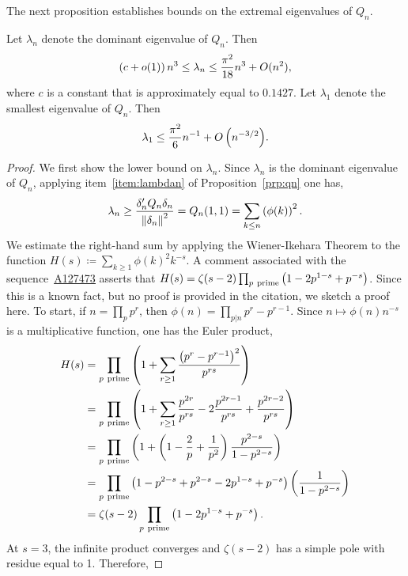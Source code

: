 \documentclass[12pt,reqno]{article}
\newcommand{\seqnum}[1]{\href{https://oeis.org/#1}{\rm \underline{#1}}}
\newcommand{\paren}[1]{\left\lparen{#1}\right\rparen}
\newcommand{\norm}[1]{\ensuremath{\left\|{#1}\right\|}}
\begin{document}
The next proposition establishes bounds on the extremal eigenvalues of $Q_n$.
\begin{proposition}
Let $\lambda_{n}$ denote the dominant eigenvalue of $Q_n$. Then
\begin{align*}
\paren{c  + o(1)}n^{3}\leq \lambda_n \leq {\frac{\pi^2}{18}n^{3} + O(n^{2})},
\end{align*}
where $c$ is a constant that is approximately equal to $0.1427$.
Let $\lambda_1$ denote the smallest eigenvalue of $Q_n$. Then
\begin{align*}
\lambda_1\leq {\frac{\pi^2}{6}n^{-1} + O\paren{n^{-3/2}}}.
\end{align*}
\label{prp:lambdanbound}
\end{proposition}
\begin{proof}
We first show the lower bound on $\lambda_n$.
Since $\lambda_n$ is the dominant eigenvalue of $Q_n$, applying item~\ref{item:lambdan} of Proposition~\ref{prp:qn} one has,
\begin{align*}
\lambda_n \geq \frac{\delta_n' Q_n \delta_n}{\norm{\delta_n}^2} = Q_n(1,1) = \sum_{k\leq n} \paren{\phi(k)}^2.
\end{align*}
We estimate the right-hand sum by applying the Wiener-Ikehara Theorem to the function $H(s)\coloneqq\sum_{k\geq 1}\phi(k)^2 k^{-s}$.
A comment associated with the sequence~\seqnum{A127473} asserts that $H(s)=\zeta(s-2)\prod_{p\ \textrm{prime}}\paren{1-2p^{1-s} + p^{-s}}$.
Since this is a known fact, but no proof is provided in the citation, we sketch a proof here. To start, if $n=\prod_{p} p^{r}$, then
$\phi(n)=\prod_{p|n} p^{r}-p^{r-1}$. Since $n\mapsto \phi(n)n^{-s}$ is a multiplicative function, one has the Euler product,
\begin{align*}
H(s)&=\prod_{p\ \textrm{prime}} \paren{1 + \sum_{r\geq 1} \frac{\paren{p^{r}-p^{r-1}}^2}{p^{rs}}}\\
&= \prod_{p\ \textrm{prime}} \paren{1 + \sum_{r\geq 1} \frac{p^{2r}}{p^{rs}} - 2\frac{p^{2r-1}}{p^{rs}} + \frac{p^{2r-2}}{p^{rs}}}\\
&= \prod_{p\ \textrm{prime}} \paren{1 + \paren{1 - \frac{2}{p} + \frac{1}{p^{2}}}\frac{p^{2-s}}{1-p^{2-s}}}\\
&= \prod_{p\ \textrm{prime}} \paren{1-p^{2-s} + {p^{2-s} - {2}{p^{1-s}} + {p^{-s}}}} \paren{\frac{1}{1-p^{2-s}}}\\
&= \zeta(s-2) \prod_{p\ \textrm{prime}} \paren{1 - 2p^{1-s}+p^{-s}}.
\end{align*}
At $s=3$, the infinite product converges and $\zeta(s-2)$ has a simple pole with residue equal to 1. Therefore,

\end{proof}
\end{document}
